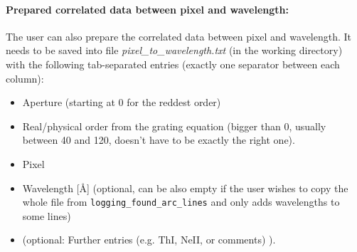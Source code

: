 \documentclass[10pt,a4paper]{article}
\begin{document}
\paragraph{Prepared correlated data between pixel and wavelength:}
The user can also prepare the correlated data between pixel and wavelength. It needs to be saved into file \textit{pixel\_to\_wavelength.txt} (in the working directory) with the following tab-separated entries (exactly one separator between each column):
\begin{itemize}\setlength\itemsep{0em}
  \item Aperture (starting at 0 for the reddest order)
  \item Real/physical order from the grating equation (bigger than 0, usually between 40 and 120, doesn't have to be exactly the right one). %
  \item Pixel
  \item Wavelength [\AA] (optional, can be also empty if the user wishes to copy the whole file from \verb|logging_found_arc_lines| and only adds wavelengths to some lines)
  \item (optional: Further entries (e.g. ThI, NeII, or comments) ).
\end{itemize}
\end{document}
